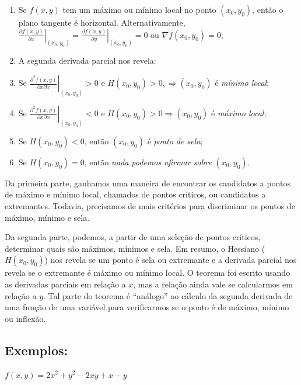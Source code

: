 \documentclass[
  portuguese,
  letterpaper,
  DIV=11,
  numbers=noendperiod]{scrreport}
\begin{document}
\begin{enumerate}
\def\labelenumi{\arabic{enumi}.}
\item
  Se \(f(x,y)\) tem um máximo ou mínimo local no ponto \((x_0, y_0)\),
  então o plano tangente é horizontal. Alternativamente,
  \(\left. \frac{\partial f(x,y)}{\partial x} \right\rvert_{(x_0,y_0)} = \left. \frac{\partial f(x,y)}{\partial y} \right|_{(x_0,y_0)} = 0 \text{ ou } \nabla f(x_0,y_0)=0\);
\item
  A segunda derivada parcial nos revela:
\item
  Se
  \(\left. \frac{\partial^2 f(x,y)}{\partial x \partial x} \right\rvert_{(x_0,y_0)}>0 \text{ e } H(x_0,y_0)>0, \Rightarrow (x_0,y_0)\)
  é \emph{mínimo local};
\item
  Se
  \(\left. \frac{\partial^2 f(x,y)}{\partial x \partial x} \right\rvert_{(x_0,y_0)}<0 \text{ e } H(x_0,y_0)>0 \Rightarrow (x_0,y_0)\)
  é \emph{máximo local};
\item
  Se \(H(x_0,y_0)<0\), então \((x_0,y_0)\) é \emph{ponto de sela};
\item
  Se \(H(x_0,y_0)=0\), então \emph{nada podemos afirmar sobre
  \((x_0,y_0)\)}.
\end{enumerate}

Da primeira parte, ganhamos uma maneira de encontrar os candidatos a
pontos de máximo e mínimo local, chamados de pontos críticos, ou
candidatos a extremantes. Todavia, precisamos de mais critérios para
discriminar os pontos de máximo, mínimo e sela.

Da segunda parte, podemos, a partir de uma seleção de pontos críticos,
determinar quais são máximos, mínimos e sela. Em resumo, o Hessiano
(\(H(x_0, y_0)\)) nos revela se um ponto é sela ou extremante e a
derivada parcial nos revela se o extremante é máximo ou mínimo local. O
teorema foi escrito usando as derivadas parciais em relação a \(x\), mas
a relação ainda vale se calcularmos em relação a \(y\). Tal parte do
teorema é ``análogo'' ao cálculo da segunda derivada de uma função de
uma variável para verificarmos se o ponto é de máximo, mínimo ou
inflexão.

\subsection{Exemplos:}\label{exemplos}

\(f(x,y)=2x^2 + y^2 − 2xy + x − y\)
\end{document}
